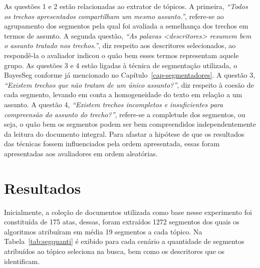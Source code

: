 As questões 1 e 2 estão relacionadas ao extrator de tópicos. 
A primeira, \textit{``Todos os trechos apresentados compartilham um mesmo assunto.''}, refere-se ao agrupamento dos segmentos pela qual foi avaliada a semelhança dos trechos em termos de assunto. 
A segunda questão, \textit{``As palavas \textit{<descritores>} resumem bem o assunto tratado nos trechos.''}, diz respeito aos descritores selecionados, ao respondê-la o avaliador indicou o quão bem esses termos representam aquele grupo.
As questões 3 e 4 estão ligadas à técnica de segmentação utilizada, o BayesSeg conforme já mencionado no Capítulo~\ref{cap-segmentadores}. 
A questão 3, \textit{``Existem trechos que não tratam de um único assunto?''}, diz respeito à coesão de cada segmento, levando em conta a homogeneidade do texto em relação a um assunto. A questão 4, \textit{``Existem trechos incompletos e insuficientes para compreensão do assunto do trecho?''}, refere-se a completude dos segmentos, ou seja, o quão bem os segmentos podem ser bem compreendidos independentemente da leitura do documento integral.
Para afastar a hipótese de que os resultados das técnicas fossem influenciados pela ordem apresentada, essas foram apresentadas aos avaliadores em ordem aleatórias.





\section{Resultados}


 
Inicialmente, a coleção de documentos utilizada como base nesse experimento foi constituída de 175 atas, dessas, foram extraídos 1272 segmentos dos quais os algoritmos atribuíram em média 19 segmentos a cada tópico. Na Tabela~\ref{tab:segquanti} é exibido para cada cenário a quantidade de segmentos atribuídos ao tópico seleciona na busca, bem como os descritores que os identificam.
 
